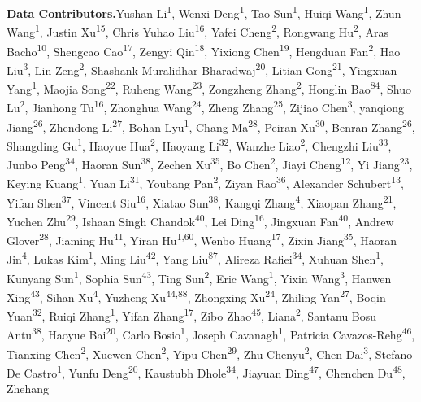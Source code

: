\noindent\textbf{Data Contributors.}\quad Yushan Li\textsuperscript{1}, Wenxi Deng\textsuperscript{1}, Tao Sun\textsuperscript{1}, Huiqi Wang\textsuperscript{1}, Zhun Wang\textsuperscript{1}, Justin Xu\textsuperscript{15}, Chris Yuhao Liu\textsuperscript{16}, Yafei Cheng\textsuperscript{2}, Rongwang Hu\textsuperscript{2}, Aras Bacho\textsuperscript{10}, Shengcao Cao\textsuperscript{17}, Zengyi Qin\textsuperscript{18}, Yixiong Chen\textsuperscript{19}, Hengduan Fan\textsuperscript{2}, Hao Liu\textsuperscript{3}, Lin Zeng\textsuperscript{2}, Shashank Muralidhar Bharadwaj\textsuperscript{20}, Litian Gong\textsuperscript{21}, Yingxuan Yang\textsuperscript{1}, Maojia Song\textsuperscript{22}, Ruheng Wang\textsuperscript{23}, Zongzheng Zhang\textsuperscript{2}, Honglin Bao\textsuperscript{84}, Shuo Lu\textsuperscript{2}, Jianhong Tu\textsuperscript{16}, Zhonghua Wang\textsuperscript{24}, Zheng Zhang\textsuperscript{25}, Zijiao Chen\textsuperscript{3}, yanqiong Jiang\textsuperscript{26}, Zhendong Li\textsuperscript{27}, Bohan Lyu\textsuperscript{1}, Chang Ma\textsuperscript{28}, Peiran Xu\textsuperscript{30}, Benran Zhang\textsuperscript{26}, Shangding Gu\textsuperscript{1}, Haoyue Hua\textsuperscript{2}, Haoyang Li\textsuperscript{32}, Wanzhe Liao\textsuperscript{2}, Chengzhi Liu\textsuperscript{33}, Junbo Peng\textsuperscript{34}, Haoran Sun\textsuperscript{38}, Zechen Xu\textsuperscript{35}, Bo Chen\textsuperscript{2}, Jiayi Cheng\textsuperscript{12}, Yi Jiang\textsuperscript{23}, Keying Kuang\textsuperscript{1}, Yuan Li\textsuperscript{31}, Youbang Pan\textsuperscript{2}, Ziyan Rao\textsuperscript{36}, Alexander Schubert\textsuperscript{13}, Yifan Shen\textsuperscript{37}, Vincent Siu\textsuperscript{16}, Xiatao Sun\textsuperscript{38}, Kangqi Zhang\textsuperscript{4}, Xiaopan Zhang\textsuperscript{21}, Yuchen Zhu\textsuperscript{29}, Ishaan Singh Chandok\textsuperscript{40}, Lei Ding\textsuperscript{16}, Jingxuan Fan\textsuperscript{40}, Andrew Glover\textsuperscript{28}, Jiaming Hu\textsuperscript{41}, Yiran Hu\textsuperscript{1,60}, Wenbo Huang\textsuperscript{17}, Zixin Jiang\textsuperscript{35}, Haoran Jin\textsuperscript{4}, Lukas Kim\textsuperscript{1}, Ming Liu\textsuperscript{42}, Yang Liu\textsuperscript{87}, Alireza Rafiei\textsuperscript{34}, Xuhuan Shen\textsuperscript{1}, Kunyang Sun\textsuperscript{1}, Sophia Sun\textsuperscript{43}, Ting Sun\textsuperscript{2}, Eric Wang\textsuperscript{1}, Yixin Wang\textsuperscript{3}, Hanwen Xing\textsuperscript{43}, Sihan Xu\textsuperscript{4}, Yuzheng Xu\textsuperscript{44,88}, Zhongxing Xu\textsuperscript{24}, Zhiling Yan\textsuperscript{27}, Boqin Yuan\textsuperscript{32}, Ruiqi Zhang\textsuperscript{1}, Yifan Zhang\textsuperscript{17}, Zibo Zhao\textsuperscript{45}, Liana\textsuperscript{2}, Santanu Bosu Antu\textsuperscript{38}, Haoyue Bai\textsuperscript{20}, Carlo Bosio\textsuperscript{1}, Joseph Cavanagh\textsuperscript{1}, Patricia Cavazos-Rehg\textsuperscript{46}, Tianxing Chen\textsuperscript{2}, Xuewen Chen\textsuperscript{2}, Yipu Chen\textsuperscript{29}, Zhu Chenyu\textsuperscript{2}, Chen Dai\textsuperscript{3}, Stefano De Castro\textsuperscript{1}, Yunfu Deng\textsuperscript{20}, Kaustubh Dhole\textsuperscript{34}, Jiayuan Ding\textsuperscript{47}, Chenchen Du\textsuperscript{48}, Zhehang 